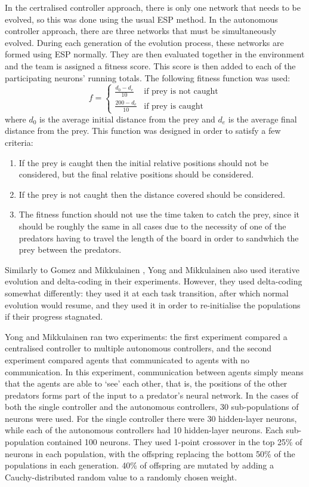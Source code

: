 \documentclass[12pt]{article} %
\begin{document}
In the certralised controller approach, there is only one network that needs to be evolved, so this was done using the usual ESP method. In the autonomous controller approach, there are three networks that must be simultaneously evolved. During each generation of the evolution process, these networks are formed using ESP normally. They are then evaluated together in the environment and the team is assigned a fitness score. This score is then added to each of the participating neurons' running totals. The following fitness function was used:
\[
f = 
\begin{cases}
\frac{d_0-d_e}{10}& \text{if prey is not caught}\\
\frac{200-d_e}{10}& \text{if prey is caught}
\end{cases}
\]
where $d_0$ is the average initial distance from the  prey and $d_e$ is the average final distance from the prey. This function was designed in order to satisfy a few criteria:
\begin{enumerate}
	\item If the prey is caught then the initial relative positions should not be considered, but the final relative positions should be considered.
	\item If the prey is not caught then the distance covered should be considered.
	\item The fitness function should not use the time taken to catch the prey, since it should be roughly the same in all cases due to the necessity of one of the predators having to travel the length of the board in order to sandwhich the prey between the predators.
\end{enumerate}
Similarly to Gomez and Mikkulainen \cite{Gomez1997}, Yong and Mikkulainen also used iterative evolution and delta-coding in their experiments. However, they used delta-coding somewhat differently: they used it at each task transition, after which normal evolution would resume, and they used it in order to re-initialise the populations if their progress stagnated.

Yong and Mikkulainen ran two experiments: the first experiment compared a centralised controller to multiple autonomous controllers, and the second experiment compared agents that communicated to agents with no communication. In this experiment, communication between agents simply means that the agents are able to `see' each other, that is, the positions of the other predators forms part of the input to a predator's neural network. In the cases of both the single controller and the autonomous controllers, 30 sub-populations of neurons were used. For the single controller there were 30 hidden-layer neurons, while each of the autonomous controllers had 10 hidden-layer neurons. Each sub-population contained 100 neurons. They used 1-point crossover in the top 25\% of neurons in each population, with the offspring replacing the bottom 50\% of the populations in each generation. 40\% of offspring are mutated by adding a Cauchy-distributed \cite{Rudolph1997} random value to a randomly chosen weight.
\end{document}
